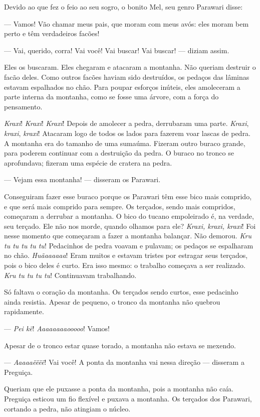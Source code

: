 Devido ao que fez o feio ao seu sogro, o bonito Mel, seu genro Parawari
disse:

--- Vamos! Vão chamar meus pais, que moram com meus avós: eles moram bem
perto e têm verdadeiros facões! 

--- Vai, querido, corra! Vai você! Vai buscar! Vai buscar! --- diziam
assim. 

Eles os buscaram. Eles chegaram e atacaram a montanha. Não queriam
 destruir o facão deles. Como outros facões haviam sido destruídos, os
 pedaços das lâminas estavam espalhados no chão. Para poupar esforços
 inúteis, eles amoleceram a parte interna da montanha, como se fosse uma
 árvore, com a força do pensamento.

\textit{Kraxi}! \textit{Kraxi}! \textit{Kraxi}! Depois de amolecer a pedra, derrubaram uma
parte. \textit{Kraxi}, \textit{kraxi}, \textit{kraxi}! Atacaram logo de todos os lados para
fazerem voar lascas de pedra. A montanha era do tamanho de uma sumaúma.
Fizeram outro buraco grande, para poderem continuar com a destruição da
pedra. O buraco no tronco se aprofundava; fizeram uma espécie de cratera
na pedra. 

--- Vejam essa montanha! --- disseram os Parawari. 

Conseguiram fazer esse buraco porque os Parawari têm esse bico mais
comprido, e que será mais comprido para sempre. Os terçados, sendo
mais compridos, começaram a derrubar a montanha. O bico do tucano
empoleirado é, na verdade, seu terçado. Ele não nos morde, quando olhamos
para ele? \textit{Kraxi, kraxi, kraxi}! Foi nesse momento que começaram a
fazer a montanha balançar. Não demorou. \textit{Kru tu tu tu tu tu}!
Pedacinhos de pedra voavam e pulavam; os pedaços se espalharam no
chão. \textit{Huãaaaaaa}! Eram muitos e estavam tristes por estragar seus
terçados, pois o bico deles é curto. Era isso mesmo: o trabalho começava
a ser realizado. \textit{Kru tu tu tu tu}! Continuavam trabalhando.

Só faltava o coração da montanha. Os terçados sendo curtos, esse
pedacinho ainda resistia. Apesar de pequeno, o tronco da montanha não
quebrou rapidamente.

--- \textit{Pei kë}! \textit{Aaaaaaaaooooo}! Vamos! 

Apesar de o tronco estar quase torado, a montanha não estava se
mexendo. 

--- \textit{Aaaaaëëëë}! Vai você! A ponta da montanha vai nessa direção
--- disseram a Preguiça. 

Queriam que ele puxasse a ponta da montanha, pois a montanha não caía.
 Preguiça esticou um fio flexível e puxava a montanha. Os terçados dos
 Parawari, cortando a pedra, não atingiam o núcleo. 

